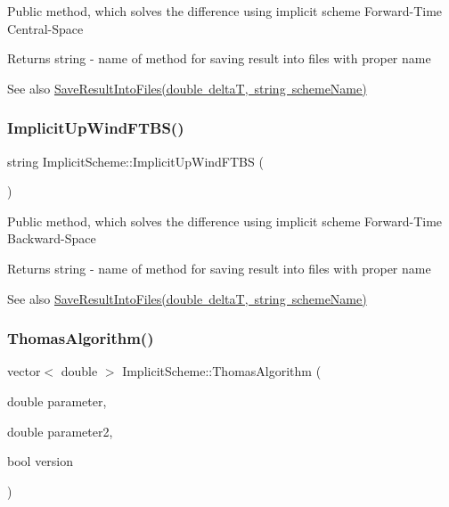 Public method, which solves the difference using implicit scheme Forward-\/\+Time Central-\/\+Space \begin{DoxyReturn}{Returns}
string -\/ name of method for saving result into files with proper name 
\end{DoxyReturn}
\begin{DoxySeeAlso}{See also}
\mbox{\hyperlink{class_scheme_ae4512b4c8ead4d8ced95174f0b241f8a}{Save\+Result\+Into\+Files(double delta\+T, string scheme\+Name)}} 
\end{DoxySeeAlso}
\mbox{\label{class_implicit_scheme_ab8311a005d69690622e0ddaa0dcff94d}} 
\subsubsection{\texorpdfstring{Implicit\+Up\+Wind\+F\+T\+B\+S()}{ImplicitUpWindFTBS()}}
{\footnotesize\ttfamily string Implicit\+Scheme\+::\+Implicit\+Up\+Wind\+F\+T\+BS (\begin{DoxyParamCaption}{ }\end{DoxyParamCaption})}

Public method, which solves the difference using implicit scheme Forward-\/\+Time Backward-\/\+Space \begin{DoxyReturn}{Returns}
string -\/ name of method for saving result into files with proper name 
\end{DoxyReturn}
\begin{DoxySeeAlso}{See also}
\mbox{\hyperlink{class_scheme_ae4512b4c8ead4d8ced95174f0b241f8a}{Save\+Result\+Into\+Files(double delta\+T, string scheme\+Name)}} 
\end{DoxySeeAlso}
\mbox{\label{class_implicit_scheme_a2f0cee270b60bc42f8f5e864255f5e29}} 
\subsubsection{\texorpdfstring{Thomas\+Algorithm()}{ThomasAlgorithm()}}
{\footnotesize\ttfamily vector$<$ double $>$ Implicit\+Scheme\+::\+Thomas\+Algorithm (\begin{DoxyParamCaption}\item[{double}]{parameter,  }\item[{double}]{parameter2,  }\item[{bool}]{version }\end{DoxyParamCaption})\hspace{0.3cm}{\ttfamily [private]}}

